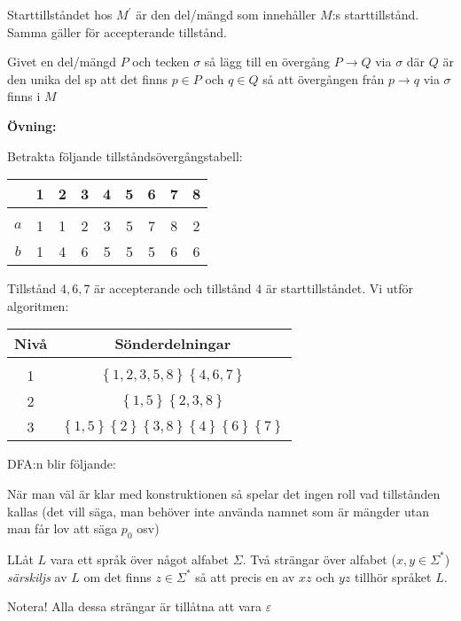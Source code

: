 \noindent Starttillståndet hos $M^{\prime}$ är den del/mängd som innehåller $M$:s starttillstånd. Samma gäller för accepterande tillstånd.\par
\noindent Givet en del/mängd $P$ och tecken $\sigma$ så lägg till en övergång $P\to Q$ via $\sigma$ där $Q$ är den unika del sp att det finns $p\in P$ och $q\in Q$ så att övergången från $p\to q$ via $\sigma$ finns i $M$ 
\par\bigskip
\noindent\textbf{Övning:}\par
\noindent Betrakta följande tillståndsövergångstabell:
\par\bigskip
\begin{center}
  \begin{tabular}{c|c|c|c|c|c|c|c|c|}
    &1&2&3&4&5&6&7&8\\
    \hline\\
    $a$&1&1&2&3&5&7&8&2\\
    $b$&1&4&6&5&5&5&6&6
  \end{tabular}
\end{center}
\par\bigskip
\noindent Tillstånd $4,6,7$ är accepterande och tillstånd $4$ är starttillståndet. Vi utför algoritmen:
\par\bigskip
\begin{center}
  \begin{tabular}{c|c}
    Nivå&Sönderdelningar\\
    \hline\\
  1&$\left\{1,2,3,5,8\right\}\left\{4,6,7\right\}$\\
  2&$\left\{1,5\right\}\left\{2,3,8\right\}$\\
3&$\left\{1,5\right\}\left\{2\right\}\left\{3,8\right\}\left\{4\right\}\left\{6\right\}\left\{7\right\}$
  \end{tabular}
\end{center}
\par\bigskip
\noindent DFA:n blir följande:
\par\bigskip
\noindent När man väl är klar med konstruktionen så spelar det ingen roll vad tillstånden kallas (det vill säga, man behöver inte använda namnet som är mängder utan man får lov att säga $p_0$ osv)
\par\bigskip
\begin{theo}
  LLåt $L$ vara ett språk över något alfabet $\Sigma$. Två strängar över alfabet ($x,y\in\Sigma^*$) \textit{särskiljs} av $L$ om det finns $z\in\Sigma^*$ så att precis en av $xz$ och $yz$ tillhör språket $L$.
  \par\bigskip
  \noindent Notera! Alla dessa strängar är tillåtna att vara $\varepsilon$
\end{theo}
